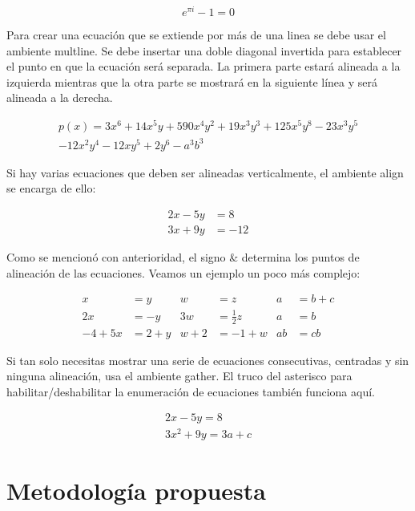 \documentclass[12pt]{article}
\begin{document}
\begin{equation} \label{eu_eqn}
e^{\pi i} - 1 = 0
\end{equation}

Para crear una ecuación que se extiende por más de una linea se debe usar el ambiente multline. Se debe insertar una doble diagonal invertida para establecer el punto en que la ecuación será separada. La primera parte estará alineada a la izquierda mientras que la otra parte se mostrará en la siguiente línea y será alineada a la derecha.

\begin{multline*}
p(x) = 3x^6 + 14x^5y + 590x^4y^2 + 19x^3y^3 + 125x^5y^8 - 23x^3y^5\\ 
- 12x^2y^4 - 12xy^5 + 2y^6 - a^3b^3
\end{multline*}

Si hay varias ecuaciones que deben ser alineadas verticalmente, el ambiente align se encarga de ello:

\begin{align*} 
2x - 5y &=  8 \\ 
3x + 9y &=  -12
\end{align*}

Como se mencionó con anterioridad, el signo \& determina los puntos de alineación de las ecuaciones. Veamos un ejemplo un poco más complejo:

\begin{align*}
x&=y           &  w &=z              &  a&=b+c\\
2x&=-y         &  3w&=\frac{1}{2}z   &  a&=b\\
-4 + 5x&=2+y   &  w+2&=-1+w          &  ab&=cb
\end{align*}

Si tan solo necesitas mostrar una serie de ecuaciones consecutivas, centradas y sin ninguna alineación, usa el ambiente gather. El truco del asterisco para habilitar/deshabilitar la enumeración de ecuaciones también funciona aquí.

\begin{gather*} 
2x - 5y =  8 \\ 
3x^2 + 9y =  3a + c
\end{gather*}
\section{Metodología propuesta}

\end{document}
